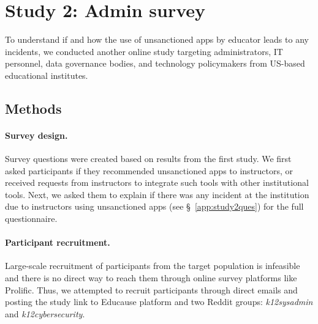\section{Study 2: Admin survey}
To understand if and how the use of unsanctioned apps by educator leads to any \SP incidents, we conducted another online study targeting administrators, IT personnel, data governance bodies, and technology policymakers from US-based educational institutes.

\subsection{Methods}

\paragraph{Survey design.}
Survey questions were created based on results from the first study. We first asked participants if they recommended unsanctioned apps to instructors, or received requests from instructors to integrate such tools with other institutional tools. Next, we asked them to explain if there was any \SP incident at the institution due to instructors using unsanctioned apps (see \S~\ref{app:study2ques}) for the full questionnaire.


\paragraph{Participant recruitment.} Large-scale recruitment of participants from the target population is infeasible~\cite{edtech-ccs2024} and there is no direct way to reach them through online survey platforms like Prolific. Thus, we attempted to recruit participants through direct emails and posting the study link to Educause platform \cite{Educause} and two Reddit 
\cite{Reddit} groups: \textit{k12sysadmin} and \textit{k12cybersecurity}. %

